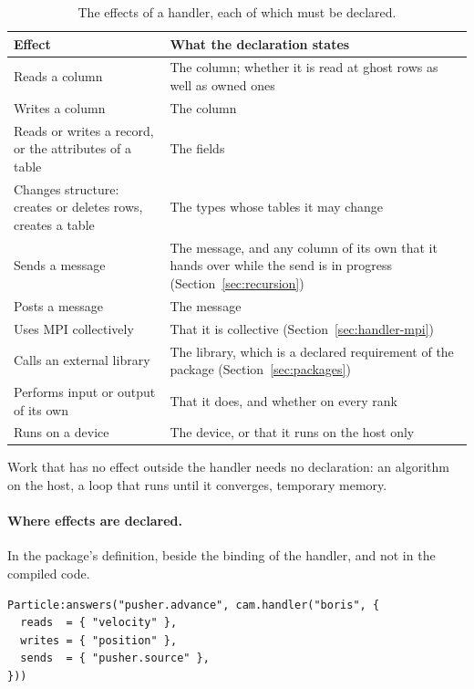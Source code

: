 \documentclass[11pt,a4paper]{article}
\begin{document}
\begin{table}[ht]
\centering
\small
\begin{tabularx}{\textwidth}{@{}>{\raggedright\arraybackslash}p{46mm} L@{}}
\toprule
Effect & What the declaration states \\
\midrule
Reads a column & The column; whether it is read at ghost rows as well as owned ones \\
Writes a column & The column \\
Reads or writes a record, or the attributes of a table & The fields \\
Changes structure: creates or deletes rows, creates a table & The types whose tables it may change \\
Sends a message & The message, and any column of its own that it hands over while the send is in progress (Section~\ref{sec:recursion}) \\
Posts a message & The message \\
Uses MPI collectively & That it is collective (Section~\ref{sec:handler-mpi}) \\
Calls an external library & The library, which is a declared requirement of the package (Section~\ref{sec:packages}) \\
Performs input or output of its own & That it does, and whether on every rank \\
Runs on a device & The device, or that it runs on the host only \\
\bottomrule
\end{tabularx}
\caption{The effects of a handler, each of which must be declared.}
\label{tab:effects}
\end{table}

Work that has no effect outside the handler needs no declaration: an
algorithm on the host, a loop that runs until it converges, temporary
memory.

\paragraph{Where effects are declared.}  In the package's definition, beside
the binding of the handler, and not in the compiled code.

\begin{lstlisting}[language={[5.3]Lua}]
Particle:answers("pusher.advance", cam.handler("boris", {
  reads  = { "velocity" },
  writes = { "position" },
  sends  = { "pusher.source" },
}))
\end{lstlisting}
\end{document}
